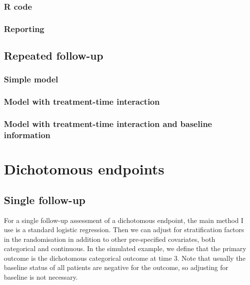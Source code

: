 \documentclass[
]{book}
\begin{document}
\subsection{R code}\label{r-code}

\subsection{Reporting}\label{reporting}

\section{Repeated follow-up}\label{repeated-follow-up}

\subsection{Simple model}\label{simple-model}

\subsection{Model with treatment-time interaction}\label{model-with-treatment-time-interaction}

\subsection{Model with treatment-time interaction and baseline information}\label{model-with-treatment-time-interaction-and-baseline-information}

\chapter{Dichotomous endpoints}\label{dichotomous-endpoints}

\section{Single follow-up}\label{single-follow-up-1}

For a single follow-up assessment of a dichotomous endpoint, the main method I use is a standard logistic regression. Then we can adjust for stratification factors in the randomisation in addition to other pre-specified covariates, both categorical and continuous. In the simulated example, we define that the primary outcome is the dichotomous categorical outcome at time 3. Note that usually the baseline status of all patients are negative for the outcome, so adjusting for baseline is not necessary.
\end{document}
